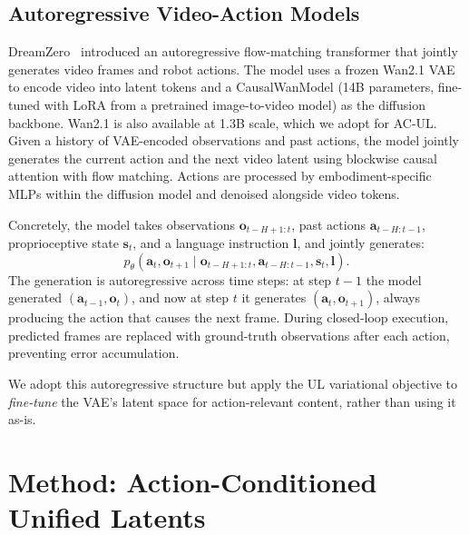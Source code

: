 \documentclass{article}
\newcommand{\vo}{\bm{o}}
\newcommand{\va}{\bm{a}}
\begin{document}
\subsection{Autoregressive Video-Action Models}
\label{sec:dreamzero_background}

DreamZero~\citep{dreamzero2025} introduced an autoregressive flow-matching transformer that jointly generates video frames and robot actions.
The model uses a frozen Wan2.1 VAE~\citep{wan2025} to encode video into latent tokens and a CausalWanModel (14B parameters, fine-tuned with LoRA from a pretrained image-to-video model) as the diffusion backbone. Wan2.1 is also available at 1.3B scale, which we adopt for AC-UL.
Given a history of VAE-encoded observations and past actions, the model jointly generates the current action and the next video latent using blockwise causal attention with flow matching.
Actions are processed by embodiment-specific MLPs within the diffusion model and denoised alongside video tokens.

Concretely, the model takes observations $\vo_{t-H+1:t}$, past actions $\va_{t-H:t-1}$, proprioceptive state $\bm{s}_t$, and a language instruction $\bm{l}$, and jointly generates:
\begin{equation}
  p_\theta(\va_t, \vo_{t+1} \mid \vo_{t-H+1:t}, \va_{t-H:t-1}, \bm{s}_t, \bm{l}).
  \label{eq:dreamzero}
\end{equation}
The generation is autoregressive across time steps: at step $t{-}1$ the model generated $(\va_{t-1}, \vo_t)$, and now at step $t$ it generates $(\va_t, \vo_{t+1})$, always producing the action that causes the next frame.
During closed-loop execution, predicted frames are replaced with ground-truth observations after each action, preventing error accumulation.

We adopt this autoregressive structure but apply the UL variational objective to \emph{fine-tune} the VAE's latent space for action-relevant content, rather than using it as-is.

\section{Method: Action-Conditioned Unified Latents}
\label{sec:method}
\end{document}
